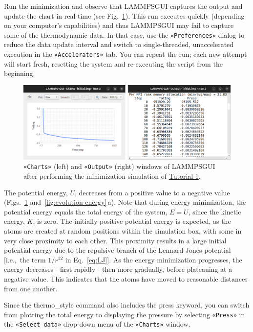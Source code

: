 \documentclass[9pt,tutorial]{livecoms}
\newcommand{\lmpcmd}[1]{\colorbox{listing}{\textcolor{command}{\small{#1}}}} %
\newcommand{\guicmd}[1]{\textcolor{command}{\texttt{«#1»}}} %
\newcommand{\lammpsgui}{\textsf{LAMMPS\textendash GUI}}
\begin{document}
Run the minimization and observe that \lammpsgui{} captures the output
and update the chart in real time (see Fig.~\ref{fig:chart-log}).  This
run executes quickly (depending on your computer's capabilities)
{\color{blue}and thus} \lammpsgui{} may fail to capture some of the
thermodynamic data.  In that case, use the \guicmd{Preferences} dialog
to reduce the data update interval and switch to single-threaded,
unaccelerated execution in the \guicmd{Accelerators} tab.  You can
repeat the run; each new attempt will start fresh, resetting the system
and re-executing the script from the beginning.

\begin{figure}
\centering
\includegraphics[width=\linewidth]{chart-and-output.png}
\caption{\guicmd{Charts} (left) and \guicmd{Output} (right) windows of \lammpsgui{}
  after performing the minimization simulation of \hyperref[lennard-jones-label]{Tutorial 1}.}
\label{fig:chart-log}
\end{figure}

The potential energy, $U$, decreases from a positive value to a negative value
(Figs.~\ref{fig:chart-log} and~\ref{fig:evolution-energy}\,a).  Note that
during energy minimization, the potential energy equals the total energy
of the system, $E = U$, since the kinetic energy, $K$, is zero.  The
initially positive potential energy is expected, as the atoms are
created at random positions within the simulation box, with some in very
close proximity to each other.  This proximity results in a large
initial potential energy due to the repulsive branch of the
Lennard-Jones potential [i.e.,~the term $1/r^{12}$ in
Eq.~\eqref{eq:LJ}].  As the energy minimization progresses, the energy
decreases - first rapidly - then more gradually, before plateauing at a
negative value.  This indicates that the atoms have moved to reasonable
distances from one another.

\begin{note}
Since the \lmpcmd{thermo\_style} command also includes the \lmpcmd{press}
keyword, you can switch from plotting the total energy to
displaying the pressure by selecting \guicmd{Press} in the \guicmd{Select data}
drop-down menu of the \guicmd{Charts} window.
\end{note}
\end{document}
